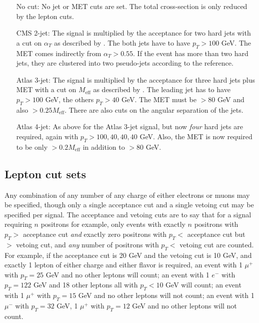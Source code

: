\documentclass[10pt]{article}
\begin{document}
\begin{itemize}

\item[No cut:] No jet or MET cuts are set. The total cross-section is only
               reduced by the lepton cuts.

\item[CMS 2-jet:] The signal is multiplied by the acceptance for two hard jets
                  with a cut on ${\alpha}_{T}$ as described by
                  \cite{Khachatryan:2011tk}. The both jets have to have
                  $p_{T} > 100$ GeV.
                  The MET comes indirectly from ${\alpha}_{T} > 0.55$.
                  If the event has more than two hard jets, they are clustered
                  into two pseudo-jets according to the reference.

\item[Atlas 3-jet:] The signal is multiplied by the acceptance for three hard
                    jets plus MET with a cut on $M_{\text{eff}}$ as described by
                    \cite{ATLAS:1278474}. The leading jet has to
                    have $p_{T} > 100$ GeV, the others
                    $p_{T} > 40$ GeV. The MET must be $> 80 $ GeV and also
                    $>0.25 M_{\text{eff}}$. There are also cuts on the angular
                    separation of the jets.

\item[Atlas 4-jet:] As above for the Atlas 3-jet signal, but now {\em{four}} hard
                    jets are required, again with $p_{T} > 100, 40, 40, 40$ GeV.
                    Also, the MET is now required to be only
                    $> 0.2 M_{\text{eff}}$ in addition to $> 80 $ GeV.

\end{itemize}


\subsection{Lepton cut sets}
\label{subsec:leptonSets}

Any combination of any number of any charge of either electrons or muons may be
 specified, though only a single acceptance cut and a single vetoing cut may be
 specified per signal. The acceptance and vetoing cuts are to say that for a
 signal requiring $n$ positrons for example, only events with exactly
 $n$ positrons with $p_{T} >$ acceptance cut {\em{and}} exactly zero positrons
 with $p_{T} <$ acceptance cut but $>$ vetoing cut, and {\em{any}} number of
 positrons with $p_{T} <$ vetoing cut are counted. For example, if the
 acceptance cut is 20 GeV and the vetoing cut is 10 GeV, and exactly 1 lepton
 of either charge and either flavor is required, an event with 1 ${\mu}^{+}$
 with $p_{T} = 25$ GeV and no other leptons will count; an event with 1 $e^{-}$
 with $p_{T} = 122$ GeV and 18 other leptons all with $p_{T} < 10$ GeV will
 count; an event with 1 ${\mu}^{+}$ with $p_{T} = 15$ GeV and no other leptons
 will not count; an event with 1 ${\mu}^{-}$ with $p_{T} = 32$ GeV,
 1 ${\mu}^{+}$ with $p_{T} = 12$ GeV and no other leptons will not count.
\end{document}
